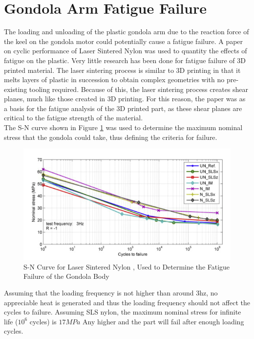 \documentclass[../main.tex]{subfiles}
\begin{document}
\section{Gondola Arm Fatigue Failure}
The loading and unloading of the plastic gondola arm due to the reaction force of the keel on the gondola motor could potentially cause a fatigue failure. A paper on cyclic performance of Laser Sintered Nylon \cite{fatiguePlastic} was used to quantity the effects of fatigue on the plastic. Very little research has been done for fatigue failure of 3D printed material. The laser sintering process is similar to 3D printing in that it melts layers of plastic in succession to obtain complex geometries with no pre-existing tooling required. Because of this, the laser sintering process creates shear planes, much like those created in 3D printing. For this reason, the paper was as a basis for the fatigue analysis of the 3D printed part, as these shear planes are critical to the fatigue strength of the material. \\

The S-N curve shown in Figure \ref{fig:snCurve} was used to determine the maximum nominal stress that the gondola could take, thus defining the criteria for failure.

\begin{figure}[H]
	\centering
	\includegraphics[width=.8\linewidth]{img/gondola/snCurve.PNG}
	\caption{S-N Curve for Laser Sintered Nylon \cite{fatiguePlastic}, Used to Determine the Fatigue Failure of the Gondola Body}
	\label{fig:snCurve}
\end{figure}

Assuming that the loading frequency is not higher than around 3hz, no appreciable heat is generated and thus the loading frequency should not affect the cycles to failure. Assuming SLS nylon, the maximum nominal stress for infinite life ($10^6$ cycles) is $17MPa$ Any higher and the part will fail after enough loading cycles.\\
\end{document}
